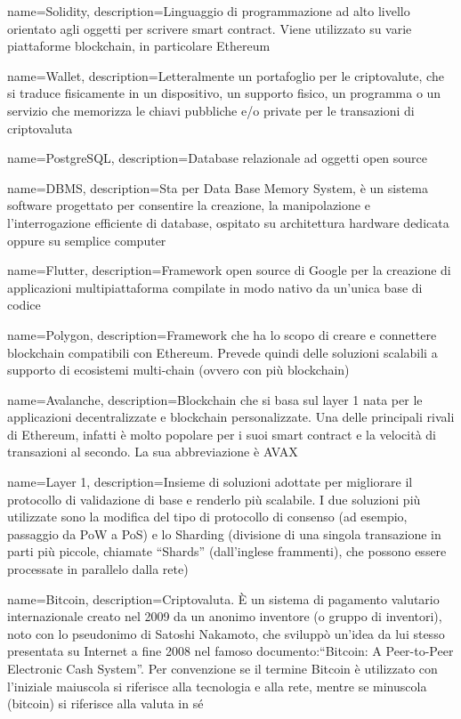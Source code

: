 {
	name={Solidity},
	description={Linguaggio di programmazione ad alto livello orientato agli oggetti per scrivere smart contract. Viene utilizzato su varie piattaforme blockchain\glo{}, in particolare Ethereum}
}

{
	name={Wallet},
	description={Letteralmente un portafoglio per le criptovalute\glo{}, che si traduce fisicamente in un dispositivo, un supporto fisico, un programma o un servizio che memorizza le chiavi pubbliche e/o private per le transazioni di criptovaluta\glo}
}	

{
	name={PostgreSQL},
	description={Database relazionale ad oggetti open source\glo}
}

{
	name={DBMS},
	description={Sta per Data Base Memory System, è un sistema software progettato per consentire la creazione, la manipolazione e l'interrogazione efficiente di database, ospitato su architettura hardware dedicata oppure su semplice computer}
}

{
	name={Flutter},
	description={Framework open source\glo{} di Google per la creazione di applicazioni multipiattaforma compilate in modo nativo da un'unica base di codice}
}

{
	name={Polygon},
	description={Framework che ha lo scopo di creare e connettere blockchain\glo{} compatibili con Ethereum. Prevede quindi delle soluzioni scalabili a supporto di ecosistemi multi-chain (ovvero con più blockchain\glo)}
}

{
	name={Avalanche},
	description={Blockchain\glo{} che si basa sul layer 1\glo{} nata per le applicazioni decentralizzate e blockchain\glo{} personalizzate. Una delle principali rivali di Ethereum, infatti è molto popolare per i suoi smart contract e la velocità di transazioni al secondo. La sua abbreviazione è AVAX}
}

{
	name={Layer 1},
	description={Insieme di soluzioni adottate per migliorare il protocollo di validazione di base e renderlo più scalabile. I due soluzioni più utilizzate sono la modifica del tipo di protocollo di consenso (ad esempio, passaggio da PoW a PoS) e lo Sharding (divisione di una singola transazione in parti più piccole, chiamate “Shards” (dall'inglese frammenti), che possono essere processate in parallelo dalla rete)}
}

{
	name={Bitcoin},
	description={Criptovaluta\glo{}. È un sistema di pagamento valutario internazionale creato nel 2009 da un anonimo inventore (o gruppo di inventori), noto con lo pseudonimo di Satoshi Nakamoto, che sviluppò un'idea da lui stesso presentata su Internet a fine 2008 nel famoso documento:“Bitcoin: A Peer-to-Peer Electronic Cash System”. Per convenzione se il termine Bitcoin è utilizzato con l'iniziale maiuscola si riferisce alla tecnologia e alla rete, mentre se minuscola (bitcoin) si riferisce alla valuta in sé}
}

